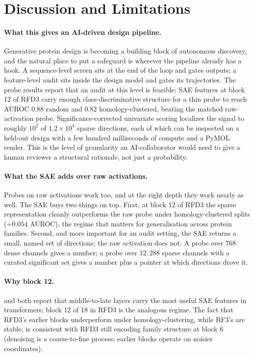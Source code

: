 \documentclass{article}
\theoremstyle{plain}
\theoremstyle{definition}
\theoremstyle{remark}
\begin{document}
\section{Discussion and Limitations}
\label{sec:discussion}

\paragraph{What this gives an AI-driven design pipeline.} Generative protein design is becoming a building block of autonomous discovery, and the natural place to put a safeguard is wherever the pipeline already has a hook. A sequence-level screen sits at the end of the loop and gates outputs; a feature-level audit sits inside the design model and gates its trajectories. The probe results report that an audit at this level is feasible: SAE features at block 12 of RFD3 carry enough class-discriminative structure for a thin probe to reach AUROC $0.88$ random and $0.82$ homology-clustered, beating the matched raw-activation probe. Significance-corrected univariate scoring localizes the signal to roughly $10^{2}$ of $1.2 \times 10^{4}$ sparse directions, each of which can be inspected on a held-out design with a few hundred milliseconds of compute and a PyMOL render. This is the level of granularity an AI-collaborator would need to give a human reviewer a structural rationale, not just a probability.

\paragraph{What the SAE adds over raw activations.} Probes on raw activations work too, and at the right depth they work nearly as well. The SAE buys two things on top. First, at block 12 of RFD3 the sparse representation cleanly outperforms the raw probe under homology-clustered splits ($+0.054$ AUROC), the regime that matters for generalisation across protein families. Second, and more important for an audit setting, the SAE returns a small, named set of directions; the raw activation does not. A probe over $768$ dense channels gives a number; a probe over $12{,}288$ sparse channels with a curated significant set gives a number plus a pointer at which directions drove it.

\paragraph{Why block 12.} \citet{gao2025scaling} and \citet{templeton2024scaling} both report that middle-to-late layers carry the most useful SAE features in transformers; block 12 of 18 in RFD3 is the analogous regime. The fact that RFD3's earlier blocks underperform under homology-clustering, while RF3's are stable, is consistent with RFD3 still encoding family structure at block 6 (denoising is a coarse-to-fine process; earlier blocks operate on noisier coordinates).
\end{document}
